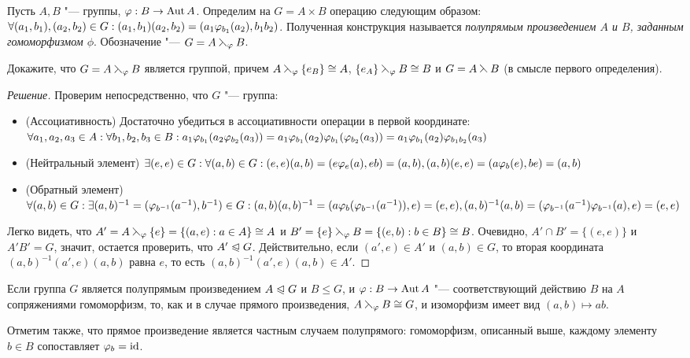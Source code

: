 \begin{definition}
	Пусть $A, B$ "--- группы, $\varphi: B \to \operatorname{Aut}{A}$. Определим на $G = A \times B$ операцию следующим образом: $\forall (a_1, b_1), (a_2, b_2) \hm\in G: (a_1, b_1)(a_2, b_2) = (a_1\phi_{b_1}(a_2), b_1b_2)$. Полученная конструкция называется \textit{полупрямым произведением $A$ и $B$, заданным гомоморфизмом $\phi$}. Обозначение "--- $G = A \leftthreetimes_{\varphi} B$.
\end{definition}

\begin{exercise}
	Докажите, что $G = A \leftthreetimes_{\varphi} B$ является группой, причем $A \sd_\phi \{e_B\} \hm\cong A$, $\{e_A\} \leftthreetimes_{\varphi} B \cong B$ и $G = A \leftthreetimes B$ (в смысле первого определения).
\end{exercise}

\begin{proof}[Решение]
	Проверим непосредственно, что $G$ "--- группа:
	\begin{itemize}
		\item (Ассоциативность) Достаточно убедиться в ассоциативности операции в первой координате: $\forall a_1, a_2, a_3 \in A: \forall b_1, b_2, b_3 \in B: a_1\phi_{b_1}(a_2\phi_{b_2}(a_3)) = a_1\phi_{b_1}(a_2)\phi_{b_1}(\phi_{b_2}(a_3)) \hm= a_1\phi_{b_1}(a_2)\phi_{b_1b_2}(a_3)$
		\item (Нейтральный элемент) $\exists (e, e) \in G: \forall (a, b) \in G: (e, e)(a, b) \hm= (e\phi_e(a), eb) \hm= (a, b), (a, b)(e, e) = (a\phi_b(e), be) = (a, b)$
		\item (Обратный элемент) $\forall (a, b) \in G: \exists (a, b)^{-1} = (\phi_{b^{-1}}(a^{-1}), b^{-1}) \hm\in G: (a, b)(a, b)^{-1} \hm= (a\phi_b(\phi_{b^{-1}}(a^{-1})), e) = (e, e), (a, b)^{-1}(a, b) \hm= (\phi_{b^{-1}}(a^{-1})\phi_{b^{-1}}(a), e) = (e, e)$
	\end{itemize}
	
	Легко видеть, что $A' = A \leftthreetimes_{\varphi} \{e\} = \{(a, e): a \in A\} \cong A$ и $B' \hm= \{e\} \sd_\phi B \hm = \{(e, b): b \hm\in B\} \cong B$. Очевидно, $A' \cap B' = \{(e, e)\}$ и $A'B' = G$, значит, остается проверить, что $A' \trianglelefteqslant G$. Действительно, если $(a', e) \in A'$ и $(a, b) \in G$, то вторая координата $(a, b)^{-1}(a', e)(a, b)$ равна $e$, то есть $(a, b)^{-1}(a', e)(a, b) \in A'$.
\end{proof}

\begin{note}
	Если группа $G$ является полупрямым произведением $A \trianglelefteqslant G$ и $B \le G$, и $\varphi: B \to \operatorname{Aut}{A}$ "--- соответствующий действию $B$ на $A$ сопряжениями гомоморфизм, то, как и в случае прямого произведения, $A \leftthreetimes_{\varphi} B \cong G$, и изоморфизм имеет вид $(a, b) \mapsto ab$.
	
	Отметим также, что прямое произведение является частным случаем полупрямого: гомоморфизм, описанный выше, каждому элементу $b \in B$ сопоставляет $\varphi_b = \operatorname{id}$.
\end{note}